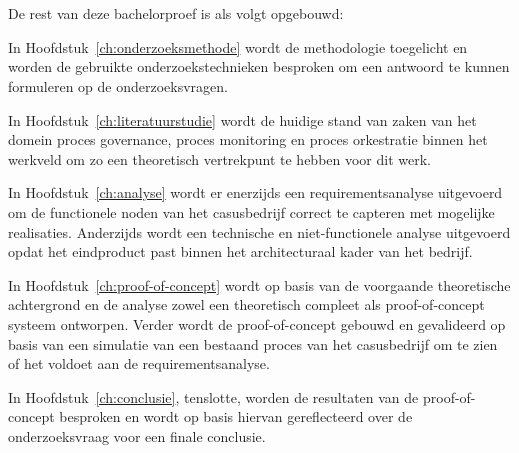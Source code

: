 \section{}%
\label{sec:opzet-bachelorproef}


De rest van deze bachelorproef is als volgt opgebouwd: \newline

In Hoofdstuk~\ref{ch:onderzoeksmethode} wordt de methodologie toegelicht en worden de gebruikte onderzoekstechnieken besproken om een antwoord te kunnen formuleren op de onderzoeksvragen.\newline

In Hoofdstuk~\ref{ch:literatuurstudie} wordt de huidige stand van zaken van het domein proces governance, proces monitoring en proces orkestratie binnen het werkveld om zo een theoretisch vertrekpunt te hebben voor dit werk.\newline

In Hoofdstuk~\ref{ch:analyse} wordt er enerzijds een requirementsanalyse uitgevoerd om de functionele noden van het casusbedrijf correct te capteren met mogelijke realisaties. Anderzijds wordt een technische en niet-functionele analyse uitgevoerd opdat het eindproduct past binnen het architecturaal kader van het bedrijf.\newline

In Hoofdstuk~\ref{ch:proof-of-concept} wordt op basis van de voorgaande theoretische achtergrond en de analyse zowel een theoretisch compleet als proof-of-concept systeem ontworpen. Verder wordt de proof-of-concept gebouwd en gevalideerd op basis van een simulatie van een bestaand proces van het casusbedrijf om te zien of het voldoet aan de requirementsanalyse.\newline

In Hoofdstuk~\ref{ch:conclusie}, tenslotte, worden de resultaten van de proof-of-concept besproken en wordt op basis hiervan gereflecteerd over de onderzoeksvraag voor een finale conclusie.